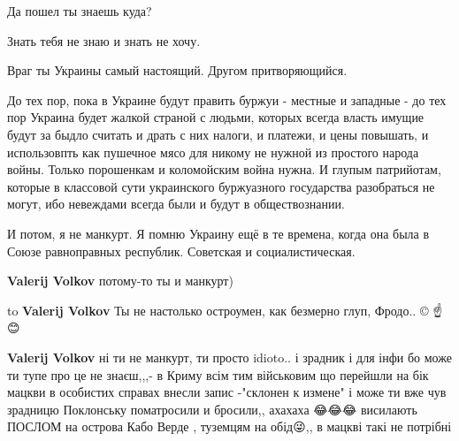 \begin{itemize}
\begin{itemize}
Да пошел ты знаешь куда?

Знать тебя не знаю и знать не хочу.

Враг ты Украины самый настоящий. Другом притворяющийся.

До тех пор, пока в Украине будут править буржуи - местные и западные - до тех
пор Украина будет жалкой страной с людьми, которых всегда власть имущие будут
за быдло считать и драть с них налоги, и платежи, и цены повышать, и
использовпть как пушечное мясо для никому не нужной из простого народа войны.
Только порошенкам и коломойским война нужна. И глупым патрийотам, которые в
классовой сути украинского буржуазного государства разобраться не могут, ибо
невеждами всегда были и будут в обществознании.


 
И потом, я не манкурт.
Я помню Украину ещё в те времена, когда она была в Союзе равноправных республик. Советская и социалистическая.

 
\textbf{Valerij Volkov} потому-то ты и манкурт)

 
to \textbf{Valerij Volkov}
Ты не настолько остроумен, как безмерно глуп, Фродо.. ©
☝️😊

 
\textbf{Valerij Volkov} ні ти не манкурт, ти просто idioto.. і зрадник
і для інфи бо може ти тупе про це не знаєш,,,-
в Криму всім тим військовим що перейшли на бік мацкви в особистих справах внесли запис -"склонен к измене"
і може ти вже чув зрадницю Поклонську поматросили и бросили,, ахахаха 😂😂😂
висилають ПОСЛОМ на острова Кабо Верде , туземцям на обід😜,, в мацкві такі не потрібні


\end{itemize}
\end{itemize}
